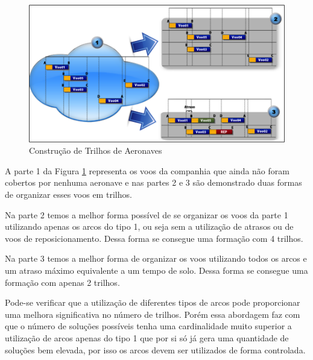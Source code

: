 \begin{figure}[ht]
	\centering
	\includegraphics[scale=0.9]{./img/arpexample}
	\caption{Construção de Trilhos de Aeronaves}
	\label{fig:arpexample}
\end{figure}

A parte 1 da Figura \ref{fig:arpexample} representa os voos da companhia que ainda não foram cobertos por nenhuma aeronave e nas partes 2 e 3 são demonstrado duas formas de organizar esses voos em trilhos. 

	Na parte 2 temos a melhor forma possível de se organizar os voos da parte 1 utilizando apenas os arcos do tipo 1, ou seja sem a utilização de atrasos ou de voos de reposicionamento. Dessa forma se consegue uma formação com 4 trilhos.

	Na parte 3 temos a melhor forma de organizar os voos utilizando todos os arcos e um atraso máximo equivalente a um tempo de solo. Dessa forma se consegue uma formação com apenas 2 trilhos.

	Pode-se verificar que a utilização de diferentes tipos de arcos pode proporcionar uma melhora significativa  no número de trilhos. Porém essa abordagem faz com que o número de soluções possíveis tenha uma cardinalidade muito superior a utilização de arcos apenas do tipo 1 que por si só já gera uma quantidade de soluções bem elevada, por isso os arcos devem ser utilizados de forma controlada. 


  
